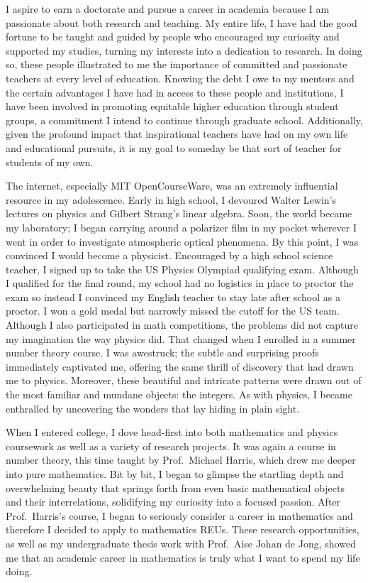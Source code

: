 \documentclass[11pt]{article}
\begin{document}
I aspire to earn a doctorate and pursue a career in academia because I am passionate about both research and teaching. My entire life, I have had the good fortune to be taught and guided by people who encouraged my curiosity and supported my studies, turning my interests into a dedication to research. In doing so, these people illustrated to me the importance of committed and passionate teachers at every level of education. Knowing the debt I owe to my mentors and the certain advantages I have had in access to these people and institutions, I have been involved in promoting equitable higher education through student groups, a commitment I intend to continue through graduate school. Additionally, given the profound impact that inspirational teachers have had on my own life and educational pursuits, it is my goal to someday be that sort of teacher for students of my own. 
\par
The internet, especially MIT OpenCourseWare, was an extremely influential resource in my adolescence. Early in high school, I devoured Walter Lewin’s lectures on physics and Gilbert Strang's linear algebra. Soon, the world became my laboratory; I began carrying around a polarizer film in my pocket wherever I went in order to investigate atmospheric optical phenomena. By this point, I was convinced I would become a physicist. Encouraged by a high school science teacher, I signed up to take the US Physics Olympiad qualifying exam. Although I qualified for the final round, my school had no logistics in place to proctor the exam so instead I convinced my English teacher to stay late after school as a proctor. I won a gold medal but narrowly missed the cutoff for the US team. Although I also participated in math competitions, the problems did not capture my imagination the way physics did. That changed when I enrolled in a summer number theory course. I was awestruck; the subtle and surprising proofs immediately captivated me, offering the same thrill of discovery that had drawn me to physics. Moreover, these beautiful and intricate patterns were drawn out of the most familiar and mundane objects: the integers. As with physics, I became enthralled by uncovering the wonders that lay hiding in plain sight.
\par
When I entered college, I dove head-first into both mathematics and physics coursework as well as a variety of research projects. It was again a course in number theory, this time taught by Prof.\ Michael Harris, which drew me deeper into pure mathematics. Bit by bit, I began to glimpse the startling depth and overwhelming beauty that springs forth from even basic mathematical objects and their interrelations, solidifying my curiosity into a focused passion. After Prof.\ Harris’s course, I began to seriously consider a career in mathematics and therefore I decided to apply to mathematics REUs. These research opportunities, as well as my undergraduate thesis work with Prof.\ Aise Johan de Jong, showed me that an academic career in mathematics is truly what I want to spend my life doing.
\end{document}
